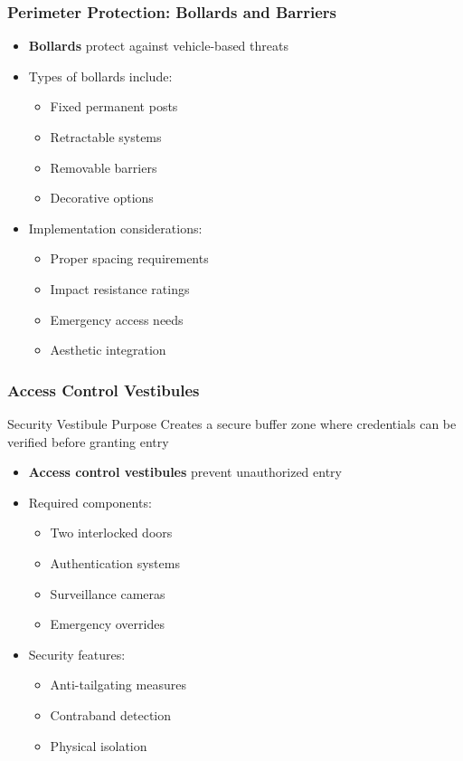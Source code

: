 \documentclass{beamer}
\begin{document}
\begin{frame}
    \frametitle{Perimeter Protection: Bollards and Barriers}
    \begin{itemize}
        \item \textbf{Bollards} protect against vehicle-based threats
        \item Types of bollards include:
          \begin{itemize}
            \item Fixed permanent posts
            \item Retractable systems
            \item Removable barriers
            \item Decorative options
          \end{itemize}
        \item Implementation considerations:
          \begin{itemize}
            \item Proper spacing requirements
            \item Impact resistance ratings
            \item Emergency access needs
            \item Aesthetic integration
          \end{itemize}
    \end{itemize}
\end{frame}

\begin{frame}
    \frametitle{Access Control Vestibules}
    \begin{block}{Security Vestibule Purpose}
        Creates a secure buffer zone where credentials can be verified before granting entry
    \end{block}
    \begin{itemize}
        \item \textbf{Access control vestibules} prevent unauthorized entry
        \item Required components:
          \begin{itemize}
            \item Two interlocked doors
            \item Authentication systems
            \item Surveillance cameras
            \item Emergency overrides
          \end{itemize}
        \item Security features:
          \begin{itemize}
            \item Anti-tailgating measures
            \item Contraband detection
            \item Physical isolation
          \end{itemize}
    \end{itemize}
\end{frame}
\end{document}
